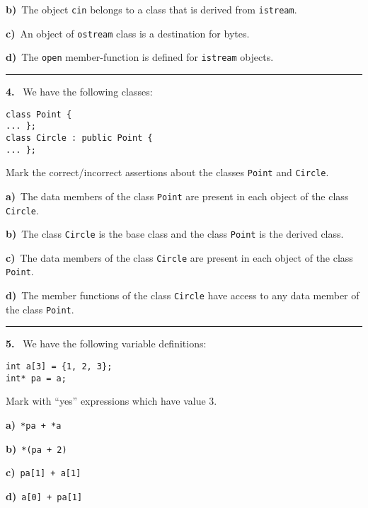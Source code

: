 \begin{multicols}{2}
{\bf b)}\ The object \verb|cin| belongs to a class that is derived from \verb|istream|.

{\bf c)}\ An object of \verb|ostream| class is a destination for bytes.

{\bf d)}\ The \verb|open| member-function is defined for \verb|istream| objects.

\par\smallskip\hrule\par\medskip

{\bf 4. }\ We have the following classes:
 \vspace{-3mm}\begin{verbatim}
class Point {
... };
class Circle : public Point {
... };
 \end{verbatim}\vspace{-6mm}
Mark the correct/incorrect assertions about the classes
\verb|Point| and \verb|Circle|.

{\bf a)}\ The data members of the class \verb|Point| are present in each object of the class \verb|Circle|.

{\bf b)}\ The class \verb|Circle| is the base class and the class \verb|Point| is the derived class.

{\bf c)}\ The data members of the class \verb|Circle| are present in each object of the class \verb|Point|.

{\bf d)}\ The member functions of the class \verb|Circle| have access to any data member of the class \verb|Point|.

\par\smallskip\hrule\par\medskip

{\bf 5. }\ We have the following variable definitions:
 \vspace{-3mm}\begin{verbatim}
int a[3] = {1, 2, 3};
int* pa = a;
 \end{verbatim}\vspace{-6mm}
Mark with ``yes'' expressions which have value 3.

{\bf a)}\ \verb|*pa + *a|

{\bf b)}\ \verb|*(pa + 2)|

{\bf c)}\ \verb|pa[1] + a[1]|

{\bf d)}\ \verb|a[0] + pa[1]|

\end{multicols}


